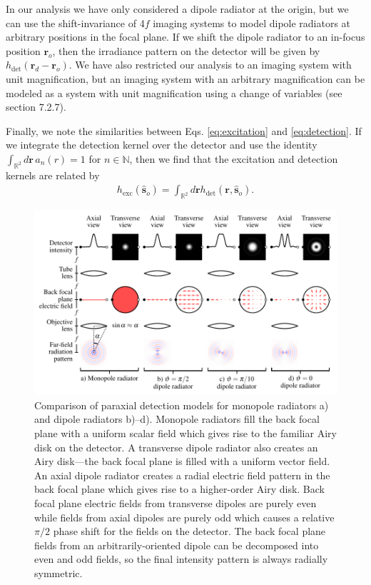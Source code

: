 \documentclass{osa-article}
\providecommand{\mb}[1]{\mathbf{#1}}
\providecommand{\ro}{\mathbf{\mathbf{r}}_o}
\providecommand{\so}{\mathbf{\hat{s}}_o}
\providecommand{\rd}{\mathbf{r}_d}
\providecommand{\mbb}[1]{\mathbb{#1}}
\begin{document}
In our analysis we have only considered a dipole radiator at the origin, but we
can use the shift-invariance of 4$f$ imaging systems to model dipole radiators
at arbitrary positions in the focal plane. If we shift the dipole radiator to an
in-focus position $\ro{}$, then the irradiance pattern on the detector will be
given by $h_{\text{det}}(\rd{} - \ro{})$. We have also restricted our analysis
to an imaging system with unit magnification, but an imaging system with an
arbitrary magnification can be modeled as a system with unit magnification using
a change of variables (see \cite{barrett2004} section 7.2.7).

Finally, we note the similarities between Eqs. \ref{eq:excitation} and
\ref{eq:detection}. If we integrate the detection kernel over the detector and
use the identity $\int_{\mbb{R}^2}d\mb{r}\, a_n(r) = 1$ for $n \in \mbb{N}$,
then we find that the excitation and detection kernels are related by
\begin{align}
  h_{\text{exc}}(\so{}) = \int_{\mbb{R}^2}d\mb{r} h_{\text{det}}(\mb{r}, \so{}).
\end{align}

\begin{figure}[h]
 \centering
   \centering
   \includegraphics[scale=0.8]{../figures/microscope/microscope.pdf}
   \caption{Comparison of paraxial detection models for monopole radiators a)
     and dipole radiators b)--d). Monopole radiators fill the back focal plane
     with a uniform scalar field which gives rise to the familiar Airy disk on
     the detector. A transverse dipole radiator also creates an Airy disk---the
     back focal plane is filled with a uniform vector field. An axial dipole
     radiator creates a radial electric field pattern in the back focal plane
     which gives rise to a higher-order Airy disk. Back focal plane electric
     fields from transverse dipoles are purely even while fields from axial
     dipoles are purely odd which causes a relative $\pi/2$ phase shift for the
     fields on the detector. The back focal plane fields from an
     arbitrarily-oriented dipole can be decomposed into even and odd fields, so
     the final intensity pattern is always radially symmetric.}
   \label{fig:microscope}
 \end{figure}
\end{document}
